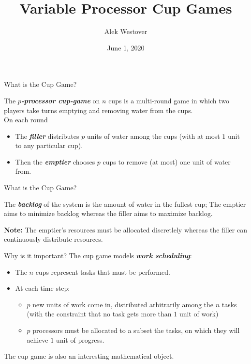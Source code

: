 \documentclass[xcolor=x11names, svgnames, rgb]{beamer}
\title{Variable Processor Cup Games}
\author{Alek Westover}
\institute{Belmont High School}
\date{June 1, 2020}
\newcommand{\defn}[1]       {{\textit{\textbf{\boldmath #1}}}}
\begin{document}
 
\frame{\titlepage}

\begin{frame}[t]{What is the Cup Game?}
  \begin{definition}
  The \defn{$p$-processor cup-game} on $n$ cups is a multi-round game in which
  two players take turns emptying and removing water from the cups. \\
  On each round
  \begin{itemize}
    \item The \defn{filler} distributes $p$ units of water among the cups (with at most $1$ unit to any particular cup). 
    \item Then the \defn{emptier} chooses $p$ cups to remove (at most) one unit of water from.
  \end{itemize}
  \end{definition}
\end{frame}

\begin{frame}[t]{What is the Cup Game?}
  \begin{definition}
  The \defn{backlog} of the system is the amount of water in the fullest cup;
  The emptier aims to minimize backlog whereas the filler aims to maximize
  backlog.
  \end{definition}
  \vspace{0.4cm}

  \textbf{Note:} The emptier's resources must be allocated discretlely whereas
  the filler can continuously distribute resources.
\end{frame}


\begin{frame}[t]{Why is it important?}
  The cup game models \defn{work scheduling}:
  \begin{itemize}
    \item The $n$ cups represent tasks that must be performed. 
    \item At each time step:
      \begin{itemize}
        \item $p$ new units of work come in, distributed
          arbitrarily among the $n$ tasks (with the constraint that no task gets
          more than $1$ unit of work) 
        \item $p$ processors must be allocated to a subset the
          tasks, on which they will achieve $1$ unit of progress.
      \end{itemize}
\end{itemize}

  \vspace{0.5cm}
  The cup game is also an interesting mathematical object.
\end{frame}
\end{document}
